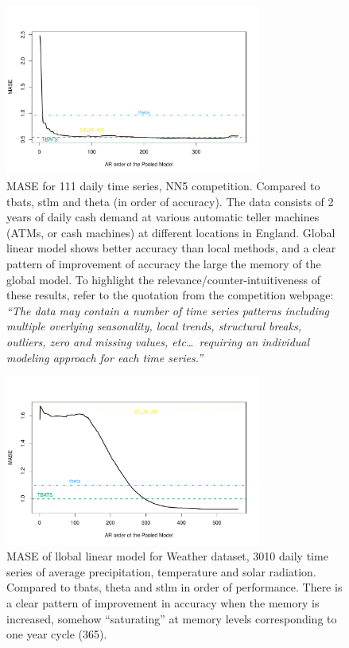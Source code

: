 \documentclass[a4paper]{article}
\theoremstyle{custom}
\begin{document}
\begin{figure}
  \centering
  \includegraphics[width=0.75\textwidth]{fig/nn5.pdf}
  \caption{MASE for 111 daily time series, NN5 competition. Compared to tbats, stlm and theta (in order of accuracy). The data consists of 2 years of daily cash demand at various automatic teller machines (ATMs, or cash machines) at different locations in England. Global linear model shows better accuracy than local methods, and a clear pattern of improvement of accuracy the large the memory of the global model. To highlight the relevance/counter-intuitiveness of these results, refer to the quotation from the competition webpage:
    \textit{``The data may contain a number of time series patterns including multiple overlying seasonality, local trends, structural breaks, outliers, zero and missing values, etc\dots\ requiring an individual modeling approach for each time series.''}
}
  \label{fig:nn5}
\end{figure}

\begin{figure}
  \centering
  \includegraphics[width=0.75\textwidth]{fig/weather.pdf}
  \caption{MASE of llobal linear model for Weather dataset, 3010 daily time series of average precipitation, temperature and solar radiation. Compared to tbats, theta and stlm in order of performance. There is a clear pattern of improvement in accuracy when the memory is increased, somehow ``saturating'' at memory levels corresponding to one year cycle (365).}
  \label{fig:weather}
\end{figure}
\end{document}
